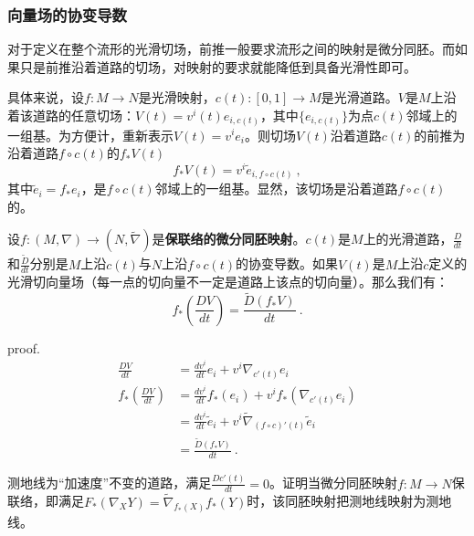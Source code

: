 \subsubsection{向量场的协变导数}

对于定义在整个流形的光滑切场，前推一般要求流形之间的映射是微分同胚。而如果只是前推沿着道路的切场，对映射的要求就能降低到具备光滑性即可。

具体来说，设$f:M\rightarrow N$是光滑映射，$c(t):[0,1]\rightarrow M$是光滑道路。$V$是$M$上沿着该道路的任意切场：$V(t)=v^i(t)e_{i,c(t)}$，其中$\{e_{i,c(t)}\}$为点$c(t)$邻域上的一组基。为方便计，重新表示$V(t)=v^ie_i$。则切场$V(t)$沿着道路$c(t)$的前推为沿着道路$f\circ c(t)$的$f_*V(t)$
\begin{equation}
f_*V(t)=v^i\widetilde e_{i,f\circ c(t)}~,
\end{equation}
其中$\widetilde e_i=f_*e_i$，是$f\circ c(t)$邻域上的一组基。显然，该切场是沿着道路$f\circ c(t)$的。




设$f:(M,\nabla)\rightarrow(N,\widetilde {\nabla})$是\textbf{保联络的微分同胚映射}。$c(t)$是$M$上的光滑道路，$\frac{D}{dt}$和$\frac{\widetilde D}{dt}$分别是$M$上沿$c(t)$与$N$上沿$f\circ  c(t)$的协变导数。如果$V(t)$是$M$上沿$c$定义的光滑切向量场（每一点的切向量不一定是道路上该点的切向量）。那么我们有：
\begin{equation}
f_*(\frac{DV}{dt})=\frac{\widetilde D(f_*V)}{dt}~.
\end{equation}

proof.
\begin{equation}
\begin{aligned}
\frac{DV}{dt}&=\frac{dv^i}{dt}e_i+v^i\nabla_{c'(t)}e_i\\
f_*(\frac{DV}{dt})&=\frac{dv^i}{dt}f_*(e_i)+v^if_*(\nabla_{c'(t)}e_i)\\
&=\frac{dv^i}{dt}\widetilde e_i+v^i\widetilde \nabla_{(f\circ c)'(t)}\widetilde e_i\\
&=\frac{\widetilde D(f_*V)}{dt}~.
\end{aligned}
\end{equation}



\begin{exercise}{}
测地线为“加速度”不变的道路，满足$\frac{Dc'(t)}{dt}=0$。证明当微分同胚映射$f:M\rightarrow N$保联络，即满足$F_*(\nabla_X Y)=\widetilde \nabla_{f_*(X)}f_*(Y)$时，该同胚映射把测地线映射为测地线。
\end{exercise}